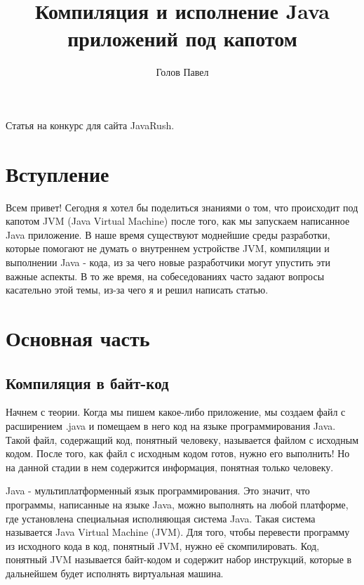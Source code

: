 \documentclass[]{scrartcl}
\title{Компиляция и исполнение Java приложений под капотом}
\author{Голов Павел}
\begin{document}
\maketitle

\begin{center}
	Статья на конкурс для сайта JavaRush.
\end{center}

\thispagestyle{empty}

\newpage

\section{Вступление}

Всем привет! Сегодня я хотел бы поделиться знаниями о том, что происходит под капотом JVM (Java Virtual Machine) после того, как мы запускаем написанное Java приложение. В наше время существуют моднейшие среды разработки, которые помогают не думать о внутреннем устройстве JVM, компиляции и выполнении Java - кода, из за чего новые разработчики могут упустить эти важные аспекты. В то же время, на собеседованиях часто задают вопросы касательно этой темы,  из-за чего я и решил написать статью.

\section{Основная часть}

\subsection{Компиляция в байт-код}

Начнем с теории. Когда мы пишем какое-либо приложение, мы создаем файл с расширением .java и помещаем в него код на языке программирования Java. Такой файл, содержащий код, понятный человеку, называется файлом с исходным кодом. После того, как файл с исходным кодом готов, нужно его выполнить! Но на данной стадии в нем содержится информация, понятная только человеку. 

Java - мультиплатформенный язык программирования. Это значит, что программы, написанные на языке Java, можно выполнять на любой платформе, где установлена специальная исполняющая система Java. Такая система называется Java Virtual Machine (JVM). Для того, чтобы перевести программу из исходного кода в код, понятный JVM, нужно её скомпилировать. Код, понятный JVM называется байт-кодом и содержит набор инструкций, которые в дальнейшем будет исполнять виртуальная машина.
\end{document}
